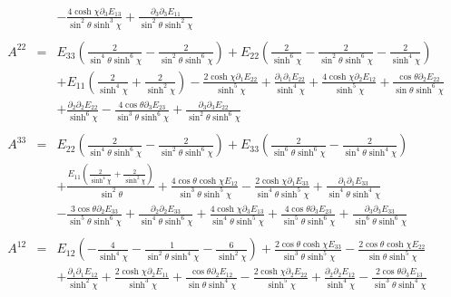 \documentclass[10pt,letterpaper]{article}
\numberwithin{equation}{section}
\begin{document}
\begin{eqnarray}
&& -  \frac{4 \cosh\chi \partial_{3}E_{13}}{\sin^2\theta \sinh^3\chi} + \frac{\partial_{3}\partial_{3}E_{11}}{\sin^2\theta \sinh^2\chi}
\\  \nonumber\\ 
A^{22}&=& E_{33} \left(\frac{2}{\sin^4\theta \sinh^6\chi} -  \frac{2}{\sin^2\theta \sinh^6\chi}\right) + E_{22} \left(\frac{2}{\sinh^6\chi} -  \frac{2}{\sin^2\theta \sinh^6\chi} -  \frac{2}{\sinh^4\chi}\right) \nonumber \\ 
&& + E_{11} \left(\frac{2}{\sinh^4\chi} + \frac{2}{\sinh^2\chi}\right) -  \frac{2 \cosh\chi \partial_{1}E_{22}}{\sinh^5\chi} + \frac{\partial_{1}\partial_{1}E_{22}}{\sinh^4\chi} + \frac{4 \cosh\chi \partial_{2}E_{12}}{\sinh^5\chi} + \frac{\cos\theta \partial_{2}E_{22}}{\sin\theta \sinh^6\chi} \nonumber \\ 
&& + \frac{\partial_{2}\partial_{2}E_{22}}{\sinh^6\chi} -  \frac{4 \cos\theta \partial_{3}E_{23}}{\sin^3\theta \sinh^6\chi} + \frac{\partial_{3}\partial_{3}E_{22}}{\sin^2\theta \sinh^6\chi}
\\  \nonumber\\ 
A^{33}&=& E_{22} \left(\frac{2}{\sin^4\theta \sinh^6\chi} -  \frac{2}{\sin^2\theta \sinh^6\chi}\right) + E_{33} \left(\frac{2}{\sin^6\theta \sinh^6\chi} -  \frac{2}{\sin^4\theta \sinh^4\chi}\right) \nonumber \\ 
&& + \frac{E_{11} \left(\frac{2}{\sinh^4\chi} + \frac{2}{\sinh^2\chi}\right)}{\sin^2\theta} + \frac{4 \cos\theta \cosh\chi E_{12}}{\sin^3\theta \sinh^5\chi} -  \frac{2 \cosh\chi \partial_{1}E_{33}}{\sin^4\theta \sinh^5\chi} + \frac{\partial_{1}\partial_{1}E_{33}}{\sin^4\theta \sinh^4\chi} \nonumber \\ 
&& -  \frac{3 \cos\theta \partial_{2}E_{33}}{\sin^5\theta \sinh^6\chi} + \frac{\partial_{2}\partial_{2}E_{33}}{\sin^4\theta \sinh^6\chi} + \frac{4 \cosh\chi \partial_{3}E_{13}}{\sin^4\theta \sinh^5\chi} + \frac{4 \cos\theta \partial_{3}E_{23}}{\sin^5\theta \sinh^6\chi} + \frac{\partial_{3}\partial_{3}E_{33}}{\sin^6\theta \sinh^6\chi}
\\  \nonumber\\ 
A^{12}&=& E_{12} \left(- \frac{4}{\sinh^4\chi} -  \frac{1}{\sin^2\theta \sinh^4\chi} -  \frac{6}{\sinh^2\chi}\right) + \frac{2 \cos\theta \cosh\chi E_{33}}{\sin^3\theta \sinh^5\chi} -  \frac{2 \cos\theta \cosh\chi E_{22}}{\sin\theta \sinh^5\chi} \nonumber \\ 
&& + \frac{\partial_{1}\partial_{1}E_{12}}{\sinh^2\chi} + \frac{2 \cosh\chi \partial_{2}E_{11}}{\sinh^3\chi} + \frac{\cos\theta \partial_{2}E_{12}}{\sin\theta \sinh^4\chi} -  \frac{2 \cosh\chi \partial_{2}E_{22}}{\sinh^5\chi} + \frac{\partial_{2}\partial_{2}E_{12}}{\sinh^4\chi} -  \frac{2 \cos\theta \partial_{3}E_{13}}{\sin^3\theta \sinh^4\chi} \nonumber \\ 

\end{eqnarray}
\end{document}
